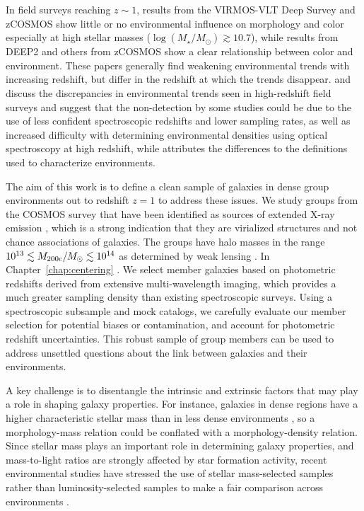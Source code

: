 In field surveys reaching $z\sim1$, results from
the VIRMOS-VLT Deep Survey \citep[VVDS;][]{Scodeggio2009} and zCOSMOS
\citep{Tasca2009,  Cucciati2010, Iovino2010, Kovac2010b} show little or
no environmental influence on morphology and color especially at high
stellar masses ($\log(M_{\star}/M_{\odot})\gtrsim10.7$), while results
from DEEP2 \citep{Cooper2010} and others from zCOSMOS \citep{Peng2010}
show a clear relationship between color and environment. These papers
generally find weakening environmental trends with increasing
redshift, but differ in the redshift at which the trends
disappear. \citet{Cooper2007} and \citet{Cooper2010} discuss the discrepancies in
environmental trends seen in high-redshift field surveys and suggest
that the non-detection by some studies could be due to
the use of less confident spectroscopic redshifts and lower sampling rates, as
well as increased difficulty with determining environmental densities
using optical spectroscopy at high redshift, while \citet{Peng2010}
attributes the differences to the definitions used to characterize
environments.

The aim of this work is to define a clean sample of galaxies in dense
group environments out to redshift $z=1$ to address these issues. We study groups from the
COSMOS survey that have been identified as sources of extended X-ray
emission \citep[][and in prep.]{Finoguenov2007}, which is a strong
indication that they are virialized structures and not chance
associations of galaxies. The groups have halo masses in the range
$10^{13} \lesssim M_{200\rm{c}}/M_{\odot} \lesssim 10^{14}$ as
determined by weak lensing \citep{Leauthaud2010}.  In
Chapter~\ref{chap:centering} \citep{George2012}. We select member 
galaxies based on photometric redshifts derived from
extensive multi-wavelength imaging, which provides a
much greater sampling density than existing spectroscopic
surveys. Using a spectroscopic subsample and mock catalogs, we
carefully evaluate our member selection for potential biases or
contamination, and account for photometric redshift
uncertainties. This robust sample of group members can be used to
address unsettled questions about the link between galaxies and their
environments.

A key challenge is to disentangle the intrinsic and extrinsic factors
that may play a role in shaping galaxy properties. For instance, galaxies
in dense regions have a higher characteristic stellar mass than in
less dense environments \citep[e.g.,][]{Baldry2006}, so a
morphology-mass relation could be conflated with a morphology-density
relation. Since stellar mass plays an important role in determining
galaxy properties, and mass-to-light ratios are strongly affected by
star formation activity, recent environmental studies have stressed
the use of stellar mass-selected samples rather than
luminosity-selected samples to make a fair comparison across
environments \citep[e.g.,][]{VanDerWel2007, Scodeggio2009,
  Cooper2010}.

